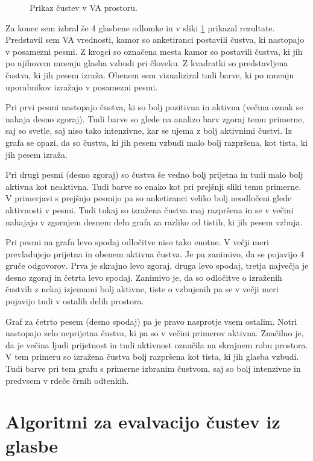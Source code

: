\documentclass[a4paper, 12pt]{book}
\begin{document}
{\begin{figure}[hbt]
\caption{Prikaz čustev v VA prostoru.}
\label{moodmusic}
\end{figure} 

Za konec sem izbral še 4 glasbene odlomke in v sliki \ref{moodmusic} prikazal rezultate. Predstavil sem VA vrednosti, kamor so anketiranci postavili čustva, ki nastopajo v posamezni pesmi. Z krogci so označena mesta kamor so postavili čustva, ki jih po njihovem mnenju glasba vzbudi pri človeku. Z kvadratki so predstavljena čustva, ki jih pesem izraža. Obenem sem vizualiziral tudi barve, ki po mnenju uporabnikov izražajo v posamezni pesmi. 

Pri prvi pesmi nastopajo čustva, ki so bolj pozitivna in aktivna (večina oznak se nahaja desno zgoraj). Tudi barve so glede na analizo barv zgoraj temu primerne, saj so svetle, saj niso tako intenzivne, kar se ujema z bolj aktivnimi čustvi. Iz grafa se opazi, da so čustva, ki jih pesem vzbudi malo bolj razpršena, kot tista, ki jih pesem izraža.

Pri drugi pesmi (desno zgoraj) so čustva še vedno bolj prijetna in tudi malo bolj aktivna kot neaktivna. Tudi barve so enako kot pri prejšnji sliki temu primerne. V primerjavi s prejšnjo pesmijo pa so anketiranci veliko bolj neodločeni glede aktivnosti v pesmi. Tudi tukaj so izražena čustva maj razpršena in se v večini nahajajo v zgornjem desnem delu grafa za razliko od tistih, ki jih pesem vzbuja. 

Pri pesmi na grafu levo spodaj odločitve niso tako enotne. V večji meri prevladujejo prijetna in obenem aktivna čustva. Je pa zanimivo, da se pojavijo 4 gruče odgovorov. Prva je skrajno levo zgoraj, druga levo spodaj, tretja največja je desno zgoraj in četrta levo spodaj. Zanimivo je, da so odločitve o izraženih čustvih z nekaj izjemami bolj aktivne, tiste o vzbujenih pa se v večji meri pojavijo tudi v ostalih delih prostora. 

Graf za četrto pesem (desno spodaj) pa je pravo nasprotje vsem ostalim. Notri nastopajo zelo neprijetna čustva, ki pa so v večini primerov aktivna. Značilno je, da je večina ljudi prijetnost in tudi aktivnost označila na skrajnem robu prostora. V tem primeru so izražena čustva bolj razpršena kot tista, ki jih glasba vzbudi. Tudi barve pri tem grafu s primerne izbranim čustvom, saj so bolj intenzivne in predvsem v rdeče črnih odtenkih. 

\chapter{Algoritmi za evalvacijo čustev iz glasbe}

}
\end{document}

